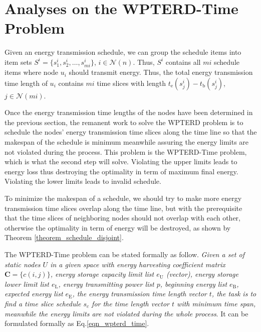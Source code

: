 \documentclass[journal,10pt]{IEEEtran}
\begin{document}
\section{Analyses on the WPTERD-Time Problem}
\label{sec_wpter_time}
Given an energy transmission schedule, we can group the schedule items into item sets $S^{i}{=}\{s^{i}_1, s^{i}_2, \ldots, s^{i}_{mi}\}$, $i{\in}\mathcal{N}(n)$. Thus, $S^{i}$ contains all $mi$ schedule items where node $u_i$ should transmit energy. Thus, the total energy transmission time length of $u_i$ contains $mi$ time slices with length $t_\text{e}(s^{i}_j){-}t_\text{b}(s^{i}_j)$, $j{\in}\mathcal{N}(mi)$.

Once the energy transmission time lengths of the nodes have been determined in the previous section, the remanent work to solve the WPTERD problem is to schedule the nodes' energy transmission time slices along the time line so that the makespan of the schedule is minimum meanwhile assuring the energy limits are not violated during the process. This problem is the WPTERD-Time problem, which is what the second step will solve. Violating the upper limits leads to energy loss thus destroying the optimality in term of maximum final energy. Violating the lower limits leads to invalid schedule.

To minimize the makespan of a schedule, we should try to make more energy transmission time slices overlap along the time line, but with the prerequisite that the time slices of neighboring nodes should not overlap with each other, otherwise the optimality in term of energy will be destroyed, as shown by Theorem \ref{theorem_schedule_disjoint}.

The WPTERD-Time problem can be stated formally as follow. \textit{Given a set of static nodes $U$ in a given space with energy harvesting coefficient matrix $\mathbf{C}{=}\{c(i,j)\}$, energy storage capacity limit list $e_\text{U}$ (vector), energy storage lower limit list $e_\text{L}$, energy transmitting power list $p$, beginning energy list $e_\text{B}$, expected energy list $e_\text{E}$, the energy transmission time length vector $t$, the task is to find a time slice schedule $s_c$ for the time length vector $t$ with minimum time span, meanwhile the energy limits are not violated during the whole process}. It can be formulated formally as Eq.\eqref{eqn_wpterd_time}.
\end{document}
